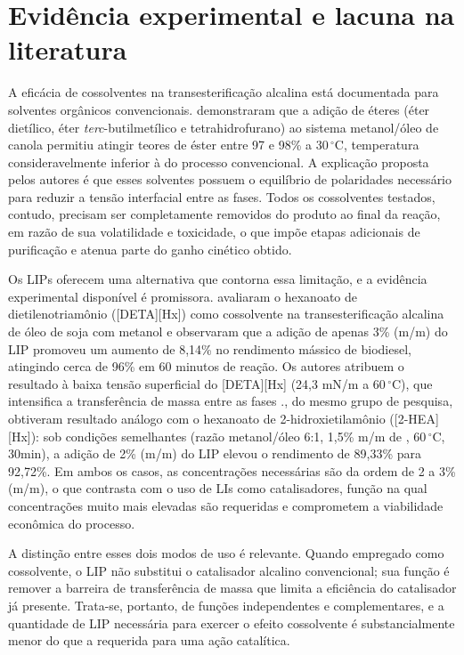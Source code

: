 \section{Evidência experimental e lacuna na literatura}

A eficácia de cossolventes na transesterificação alcalina está documentada para solventes orgânicos convencionais.  demonstraram que a adição de éteres (éter dietílico, éter \textit{terc}-butilmetílico e tetrahidrofurano) ao sistema metanol/óleo de canola permitiu atingir teores de éster entre 97 e 98\% a 30\,$^{\circ}$C, temperatura consideravelmente inferior à do processo convencional. A explicação proposta pelos autores é que esses solventes possuem o equilíbrio de polaridades necessário para reduzir a tensão interfacial entre as fases\cite{encinar2016}. Todos os cossolventes testados, contudo, precisam ser completamente removidos do produto ao final da reação, em razão de sua volatilidade e toxicidade, o que impõe etapas adicionais de purificação e atenua parte do ganho cinético obtido\cite{encinar2016}.

Os LIPs oferecem uma alternativa que contorna essa limitação, e a evidência experimental disponível é promissora. avaliaram o hexanoato de dietilenotriamônio ([DETA][Hx]) como cossolvente na transesterificação alcalina de óleo de soja com metanol e observaram que a adição de apenas 3\% (m/m) do LIP promoveu um aumento de 8,14\% no rendimento mássico de biodiesel, atingindo cerca de 96\% em 60 minutos de reação. Os autores atribuem o resultado à baixa tensão superficial do [DETA][Hx] (24,3 mN/m a 60\,$^{\circ}$C), que intensifica a transferência de massa entre as fases \cite{trindade2019}., do mesmo grupo de pesquisa, obtiveram resultado análogo com o hexanoato de 2-hidroxietilamônio ([2-HEA][Hx]): sob condições semelhantes (razão metanol/óleo 6:1, 1,5\% m/m de , 60\,$^{\circ}$C, 30min), a adição de 2\% (m/m) do LIP elevou o rendimento de 89,33\% para 92,72\%\cite{gomez2019}. Em ambos os casos, as concentrações necessárias são da ordem de 2 a 3\% (m/m), o que contrasta com o uso de LIs como catalisadores, função na qual concentrações muito mais elevadas são requeridas e comprometem a viabilidade econômica do processo\cite{muhammad2015,troter2016}.

A distinção entre esses dois modos de uso é relevante. Quando empregado como cossolvente, o LIP não substitui o catalisador alcalino convencional; sua função é remover a barreira de transferência de massa que limita a eficiência do catalisador já presente. Trata-se, portanto, de funções independentes e complementares, e a quantidade de LIP necessária para exercer o efeito cossolvente é substancialmente menor do que a requerida para uma ação catalítica\cite{trindade2019}.

